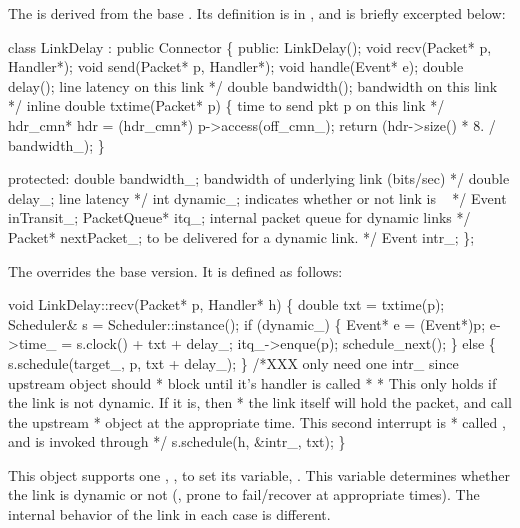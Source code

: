 The  is derived from the
base .
Its definition is in , and is briefly excerpted below:
\begin{program}
        class LinkDelay : public Connector \{
         public:
                LinkDelay();
                void recv(Packet* p, Handler*);
                void send(Packet* p, Handler*);
                void handle(Event* e);
                double delay();    \* line latency on this link */
                double bandwidth(); \* bandwidth on this link */
                inline double txtime(Packet* p) \{ \* time to send pkt p on this link */
                        hdr_cmn* hdr = (hdr_cmn*) p->access(off_cmn_);
                        return (hdr->size() * 8. / bandwidth_);
                \}

         protected:
                double bandwidth_; \* bandwidth of underlying link (bits/sec) */
                double delay_;     \* line latency */
                int dynamic_;     \* indicates whether or not link is ~ */
                Event inTransit_;
                PacketQueue* itq_; \* internal packet queue for dynamic links */
                Packet* nextPacket_; \* to be delivered for a dynamic link. */
                Event intr_;
        \};
\end{program}
The 
overrides the base
 version.
It is defined as follows:
\begin{program}
        void LinkDelay::recv(Packet* p, Handler* h)
        \{    
                double txt = txtime(p);
                Scheduler& s = Scheduler::instance();
                if (dynamic_) \{
                        Event* e = (Event*)p;
                        e->time_ = s.clock() + txt + delay_; 
                        itq_->enque(p);
                        schedule_next();
                \} else \{
                        s.schedule(target_, p, txt + delay_);
                \}       
                /*{\cf XXX only need one intr_ since upstream object should}
                 * {\cf block until it's handler is called}
                 *       
                 * {\cf This only holds if the link is not dynamic.  If it is, then}
                 * {\cf the link itself will hold the packet, and call the upstream}
                 * {\cf object at the appropriate time.  This second interrupt is}
                 * {\cf called , and is invoked through }
                 */
                s.schedule(h, &intr_, txt);
        \}   
\end{program}
This object supports one 
,
,
to set its variable, . 
This variable determines whether the link is dynamic or not (\ie, prone
to fail/recover at appropriate times).
The internal behavior of the link in each case is different.

